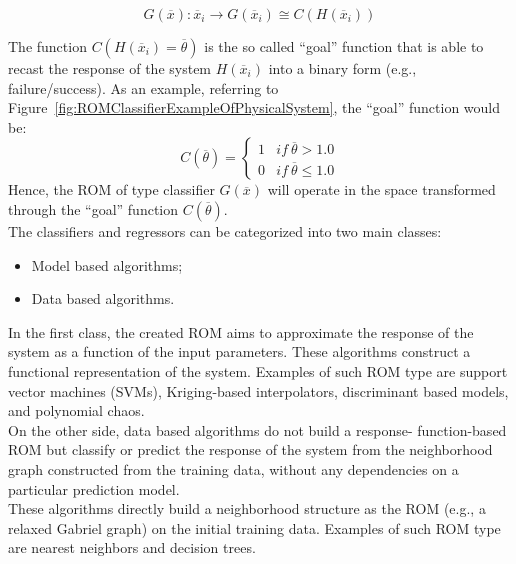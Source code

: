 \begin{equation}
\label{eq:classifier}
G\left ( \overline{x} \right ):\overline{x}_{i} \rightarrow G\left ( \overline{x}_{i} \right ) \cong 
C \left ( H\left ( \overline{x}_{i} \right ) \right )
\end{equation}

The function $C\left (  H\left ( \overline{x}_{i}  \right ) = \overline{\theta} 
\right ) $ is the so called ``goal'' function that is able to recast the 
response of the system $H\left ( \overline{x}_{i}  \right )$ into a binary 
form (e.g., failure/success). As an example, referring to 
Figure~\ref{fig:ROMClassifierExampleOfPhysicalSystem}, the 
``goal'' function would be:
\begin{equation}
\label{eq:goalFunctionClassifier}
C\left (   \overline{\theta}  \right ) = \left\{\begin{matrix}
1 & if \: \overline{\theta}>1.0 \\ 
0 &  if \: \overline{\theta} \leq 1.0
\end{matrix}\right.
\end{equation}
Hence, the ROM of type classifier $G\left (  \overline{x} \right )$  will operate in the space transformed through the ``goal''  function $C\left (   \overline{\theta}  \right )$. 
\\The classifiers and regressors can be categorized into two main classes:
\begin{itemize}
  \item Model based algorithms;
  \item Data based algorithms.
\end{itemize}
In the first class, the created ROM aims to approximate the response 
of the system as a function of the input parameters. These algorithms 
construct a functional representation of the system. Examples of such ROM type are support vector machines (SVMs), Kriging-based interpolators, discriminant based models, and polynomial chaos.
\\On the other side, data based algorithms do not build a response-
function-based ROM but classify or predict the response of the 
system from the neighborhood graph constructed from the training 
data, without any dependencies on a particular prediction model.
\\These algorithms directly build a neighborhood structure as the 
ROM (e.g., a relaxed Gabriel graph) on the initial training data. Examples of such ROM type are nearest neighbors and decision trees.


